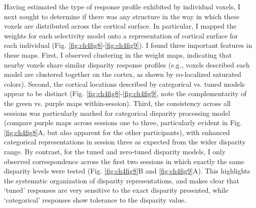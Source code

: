 Having estimated the type of response profile exhibited by individual voxels, I next sought to determine if there was any structure in the way in which these voxels are distributed across the cortical surface. In particular, I mapped the weights for each selectivity model onto a representation of cortical surface for each individual (Fig. \ref{fig:ch4fig8}-\ref{fig:ch4fig9}). I found three important features in these maps. First, I observed clustering in the weight maps, indicating that nearby voxels share similar disparity response profiles (e.g., voxels described each model are clustered together on the cortex, as shown by co-localized saturated colors). Second, the cortical locations described by categorical vs. tuned models appear to be distinct (Fig. \ref{fig:ch4fig8}-\ref{fig:ch4fig9}, note the complementarity of the green vs. purple maps within-session). Third, the consistency across all sessions was particularly marked for categorical disparity processing model (compare purple maps across sessions one to three, particularly evident in Fig. \ref{fig:ch4fig8}A, but also apparent for the other participants), with enhanced categorical representations in session three as expected from the wider disparity range. By contrast, for the tuned and zero-tuned disparity models, I only observed correspondence across the first two sessions in which exactly the same disparity levels were tested (Fig. \ref{fig:ch4fig8}B and \ref{fig:ch4fig9}A). This highlights the systematic organization of disparity representations, and makes clear that `tuned' responses are very sensitive to the exact disparity presented, while `categorical' responses show tolerance to the disparity value.

